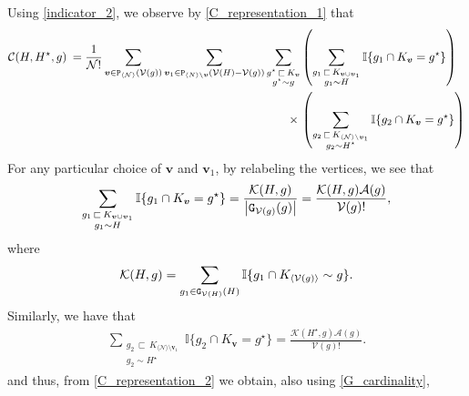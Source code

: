 \documentclass[11pt,reqno]{amsart}
\numberwithin{equation}{section}
\newcommand{\abs}[1]{\left\lvert #1 \right\rvert}
\newcommand{\sprod}[1]{\langle#1\rangle}
\newcommand{\kb}[1]{\boldsymbol{#1}}
\newcommand{\vk}[1]{\kb{#1}}
\begin{document}
Using \eqref{indicator_2}, we observe by \eqref{C_representation_1} that 
\begin{align}
    \mathcal{C}({H},{H^{\star}},g) \:= \frac{1}{\mathcal{N}!}\sum_{\vk v\in {\tt P}_{\sprod{\mathcal{N}}}(\mathcal{V}(g))}\sum_{\vk v_1\in{\tt P}_{\sprod{N}\setminus\vk v}(\mathcal{V}({H})-\mathcal{V}(g))}\sum_{\substack{g^{\star}{\,\sqsubset\,} K_{\vk v} \\ g^{\star}\sim g}}&\left(\sum_{\substack{g_1{\,\sqsubset\,} K_{\vk v\cup \vk v_1} \\ g_1\sim {H}}}\mathbb{I}\{g_1\cap K_{\vk v} = g^{\star}\}\right)\notag\\
    \hspace{6.3cm}\times\,&\left(\sum_{\substack{g_2{\,\sqsubset\,} K_{\sprod{\mathcal{N}}\setminus \vk v_1} \\ g_2\sim {H^{\star}}}}\mathbb{I}\{g_2\cap K_{\vk v} = g^{\star}\}\right)\label{C_representation_2}
\end{align}
For any particular choice of $\vk v$ and $\vk v_1$, by relabeling the vertices, we see that
\begin{align*}
    \sum_{\substack{g_1{\,\sqsubset\,} K_{\vk v\cup \vk v_1} \\ g_1\sim {H}}}\mathbb{I}\{g_1\cap K_{\vk v} = g^{\star}\} = \frac{\mathcal{K}({H},g)}{\abs{{\tt G}_{\mathcal{V}(g)}(g)}}=\frac{\mathcal{K}({H},g)\mathcal{A}(g)}{\mathcal{V}(g)!},
\end{align*}
where
\begin{align*}
        \mathcal{K}({H},g) = \sum_{g_1\in{\tt G}_{\mathcal{V}({H})}({H})}\mathbb{I}\{g_1\cap K_{\sprod{\mathcal{V}(g)}}\sim g\}.
    \end{align*}
Similarly, we have that
\begin{align*}
    \sum_{\substack{g_2{\,\sqsubset\,} K_{\sprod{\mathcal{N}}\setminus \vk v_1} \\ g_2\sim {H^{\star}}}}\mathbb{I}\{g_2\cap K_{\vk v} = g^{\star}\} = \frac{\mathcal{K}({H^{\star}},g)\mathcal{A}(g)}{\mathcal{V}(g)!}.
\end{align*}
and thus, from \eqref{C_representation_2} we obtain, {also using \eqref{G_cardinality}},
\end{document}
